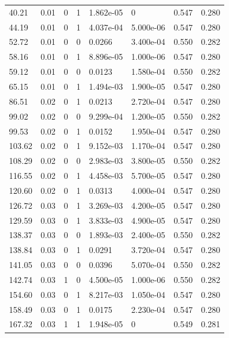 \documentclass[preview]{standalone}
\begin{document}
{{\begin{tabular}{L{1.2cm}C{1.2cm} C{0.3cm}C{0.5cm} C{1.4cm}C{1.4cm} C{1.4cm}C{1.4cm}}
  40.21  &  0.01  & 0     &  1 &  1.862e-05  & 0  & 0.547 &  0.280   \\ 
  44.19  &  0.01  & 0     &  1 &  4.037e-04  & 5.000e-06  & 0.547 &  0.280   \\ 
  52.72  &  0.01  & 0     &  0 &  0.0266  & 3.400e-04  & 0.550 &  0.282   \\ 
  58.16  &  0.01  & 0     &  1 &  8.896e-05  & 1.000e-06  & 0.547 &  0.280   \\ 
  59.12  &  0.01  & 0     &  0 &  0.0123  & 1.580e-04  & 0.550 &  0.282   \\ 
  65.15  &  0.01  & 0     &  1 &  1.494e-03  & 1.900e-05  & 0.547 &  0.280   \\ 
  86.51  &  0.02  & 0     &  1 &  0.0213  & 2.720e-04  & 0.547 &  0.280   \\ 
  99.02  &  0.02  & 0     &  0 &  9.299e-04  & 1.200e-05  & 0.550 &  0.282   \\ 
  99.53  &  0.02  & 0     &  1 &  0.0152  & 1.950e-04  & 0.547 &  0.280   \\ 
  103.62  &  0.02  & 0     &  1 &  9.152e-03  & 1.170e-04  & 0.547 &  0.280   \\ 
  108.29  &  0.02  & 0     &  0 &  2.983e-03  & 3.800e-05  & 0.550 &  0.282   \\ 
  116.55  &  0.02  & 0     &  1 &  4.458e-03  & 5.700e-05  & 0.547 &  0.280   \\ 
  120.60  &  0.02  & 0     &  1 &  0.0313  & 4.000e-04  & 0.547 &  0.280   \\ 
  126.72  &  0.03  & 0     &  1 &  3.269e-03  & 4.200e-05  & 0.547 &  0.280   \\ 
  129.59  &  0.03  & 0     &  1 &  3.833e-03  & 4.900e-05  & 0.547 &  0.280   \\ 
  138.37  &  0.03  & 0     &  0 &  1.893e-03  & 2.400e-05  & 0.550 &  0.282   \\ 
  138.84  &  0.03  & 0     &  1 &  0.0291  & 3.720e-04  & 0.547 &  0.280   \\ 
  141.05  &  0.03  & 0     &  0 &  0.0396  & 5.070e-04  & 0.550 &  0.282   \\ 
  142.74  &  0.03  & 1     &  0 &  4.500e-05  & 1.000e-06  & 0.550 &  0.282   \\ 
  154.60  &  0.03  & 0     &  1 &  8.217e-03  & 1.050e-04  & 0.547 &  0.280   \\ 
  158.49  &  0.03  & 0     &  1 &  0.0175  & 2.230e-04  & 0.547 &  0.280   \\ 
  167.32  &  0.03  & 1     &  1 &  1.948e-05  & 0  & 0.549 &  0.281   \\ 

\end{tabular}}}
\end{document}
